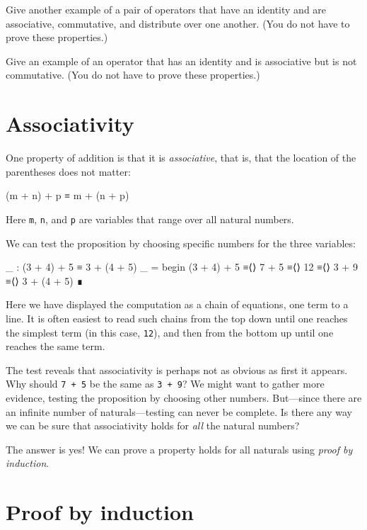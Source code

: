 Give another example of a pair of operators that have an identity and
are associative, commutative, and distribute over one another. (You do
not have to prove these properties.)

Give an example of an operator that has an identity and is associative
but is not commutative. (You do not have to prove these properties.)

\hypertarget{associativity}{%
\section{Associativity}\label{associativity}}

One property of addition is that it is \emph{associative}, that is, that
the location of the parentheses does not matter:

\begin{myDisplay}
(m + n) + p ≡ m + (n + p)
\end{myDisplay}

Here \texttt{m}, \texttt{n}, and \texttt{p} are variables that range
over all natural numbers.

We can test the proposition by choosing specific numbers for the three
variables:

\begin{fence}
\begin{code}
_ : (3 + 4) + 5 ≡ 3 + (4 + 5)
_ =
  begin
    (3 + 4) + 5
  ≡⟨⟩
    7 + 5
  ≡⟨⟩
    12
  ≡⟨⟩
    3 + 9
  ≡⟨⟩
    3 + (4 + 5)
  ∎
\end{code}
\end{fence}

Here we have displayed the computation as a chain of equations, one term
to a line. It is often easiest to read such chains from the top down
until one reaches the simplest term (in this case, \texttt{12}), and
then from the bottom up until one reaches the same term.

The test reveals that associativity is perhaps not as obvious as first
it appears. Why should \texttt{7\ +\ 5} be the same as \texttt{3\ +\ 9}?
We might want to gather more evidence, testing the proposition by
choosing other numbers. But---since there are an infinite number of
naturals---testing can never be complete. Is there any way we can be
sure that associativity holds for \emph{all} the natural numbers?

The answer is yes! We can prove a property holds for all naturals using
\emph{proof by induction}.

\hypertarget{proof-by-induction}{%
\section{Proof by induction}\label{proof-by-induction}}

